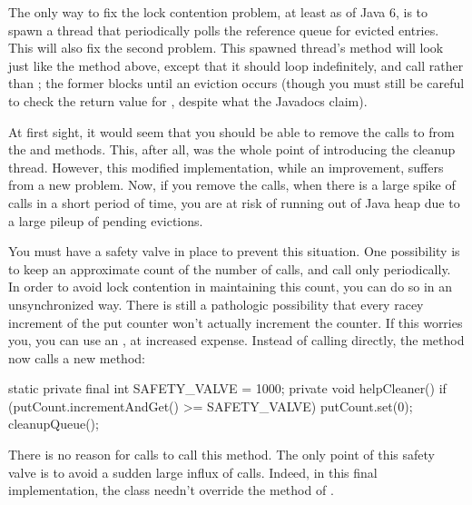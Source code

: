 The only way to fix the lock contention problem, at least as of Java 6, is to
spawn a thread that periodically polls the reference queue for evicted entries.
This will also fix the second problem. This spawned thread's  method
will look just like the  method above, except that it should
loop indefinitely, and call  rather than ;
the former blocks until an eviction occurs (though you must still be careful to
check the return value for , despite what the Javadocs claim).

At first sight, it would seem that you should be able to remove the calls to
 from the  and  methods. This, after all,
was the whole point of introducing the cleanup thread. However, this modified
implementation, while an improvement, suffers from a new problem. Now, if you
remove the  calls, when there is a large spike of 
calls in a short period of time, you are at risk of running out of Java heap due
to a large pileup of pending evictions.

You must have a safety valve in place to prevent this situation. One possibility
is to keep an approximate count of the number of  calls, and call
 only periodically. In order to avoid lock contention in
maintaining this count, you can do so in an unsynchronized way. There is still a
pathologic possibility that every racey increment of the put counter won't
actually increment the counter. If this worries you, you can use an
, at increased expense. Instead of calling
 directly, the  method now calls a new
 method:
\begin{shortlisting}
   static private final int SAFETY_VALVE = 1000;
   private void helpCleaner() {
      if (putCount.incrementAndGet() >= SAFETY_VALVE) {
         putCount.set(0);
         cleanupQueue();
      }
   }
\end{shortlisting}
There is no reason for  calls to call this method. The only point of
this safety valve is to avoid a sudden large influx of  calls. Indeed,
in this final implementation, the  class needn't override
the  method of .
